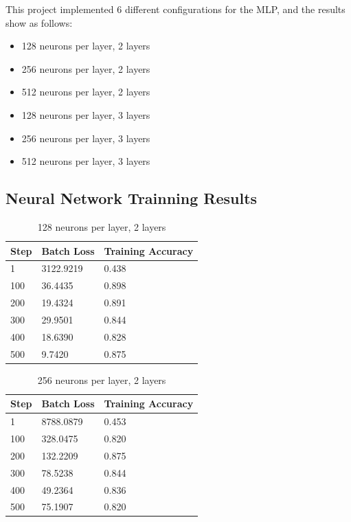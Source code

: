 \documentclass{article}
\begin{document}
This project implemented 6 different configurations for the MLP, and the results show as follows:

\begin{itemize}
  \item 128 neurons per layer, 2 layers
  \item 256 neurons per layer, 2 layers
  \item 512 neurons per layer, 2 layers
  \item 128 neurons per layer, 3 layers
  \item 256 neurons per layer, 3 layers
  \item 512 neurons per layer, 3 layers
\end{itemize}

\newpage

\subsection{Neural Network Trainning Results}

\begin{table}[!h]
  \centering
  \begin{tabular}{@{}lll@{}}
  \toprule
  Step  & Batch Loss  & Training Accuracy \\ \midrule
  1     & 3122.9219   & 0.438 \\
  100   & 36.4435     & 0.898 \\
  200   & 19.4324     & 0.891 \\
  300   & 29.9501     & 0.844 \\
  400   & 18.6390     & 0.828 \\
  500   & 9.7420      & 0.875 \\ \bottomrule
  \end{tabular}
  \caption{128 neurons per layer, 2 layers}
\end{table}

\begin{table}[!h]
  \centering
  \begin{tabular}{@{}lll@{}}
  \toprule
  Step  & Batch Loss  & Training Accuracy \\ \midrule
  1     & 8788.0879   & 0.453 \\
  100   & 328.0475    & 0.820 \\
  200   & 132.2209    & 0.875 \\
  300   & 78.5238     & 0.844 \\
  400   & 49.2364     & 0.836 \\
  500   & 75.1907     & 0.820 \\ \bottomrule
  \end{tabular}
  \caption{256 neurons per layer, 2 layers}
\end{table}
\end{document}
